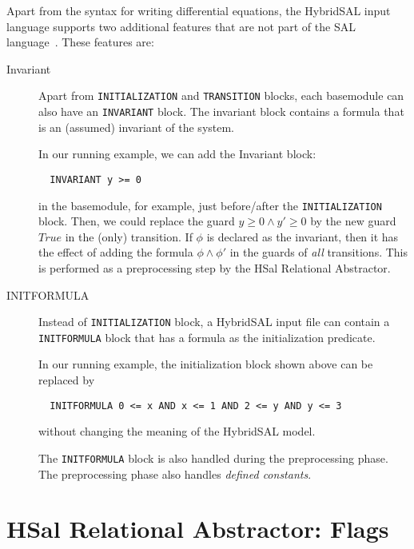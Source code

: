 \documentclass{article}
\begin{document}
Apart from the syntax for writing differential equations,
the HybridSAL input language supports two additional features
that are not part of the SAL language~\cite{sal}.
These features are:
\begin{description}
\item[Invariant]
 Apart from {\tt{INITIALIZATION}} and {\tt{TRANSITION}} blocks,
 each basemodule can also have an {\tt{INVARIANT}} block.
 The invariant block contains a formula that is an (assumed)
 invariant of the system.
 
 In our running example, we can add the Invariant block:
 \begin{tt}
 \begin{verbatim}
  INVARIANT y >= 0
 \end{verbatim}
 \end{tt}
 in the basemodule, for example, just before/after the 
 {\tt{INITIALIZATION}} block.
 Then, we could replace the guard
 $y \geq 0 \wedge y'\geq 0$ by the new guard $\mathit{True}$
 in the (only) transition.
 If $\phi$ is declared as the invariant, then it has the
 effect of adding the formula $\phi \wedge \phi'$ in the guards
 of {\em{all}} transitions.  This is performed as a preprocessing
 step by the HSal Relational Abstractor.

\item[INITFORMULA]
 Instead of {\tt{INITIALIZATION}} block, a HybridSAL input file
 can contain a {\tt{INITFORMULA}} block that has a formula
 as the initialization predicate.
 
 In our running example, the initialization block shown above
 can be replaced by
 \begin{tt}
 \begin{verbatim}
  INITFORMULA 0 <= x AND x <= 1 AND 2 <= y AND y <= 3
 \end{verbatim}
 \end{tt}
 without changing the meaning of the HybridSAL model.

 The {\tt{INITFORMULA}} block is also handled during the
 preprocessing phase.
 The preprocessing phase also handles {\em{defined constants}}.
\end{description}

\section{HSal Relational Abstractor: Flags}
\end{document}
